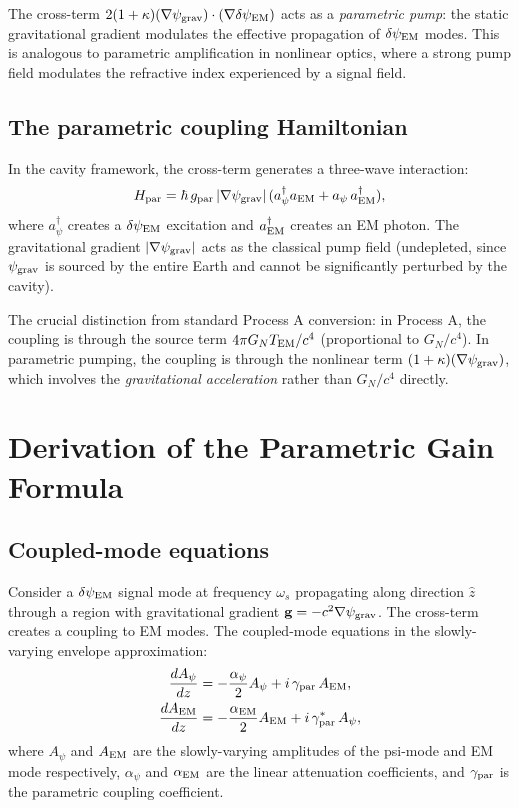\documentclass[11pt]{article}
\newcommand{\psigrav}{\psi_{\rm grav}}
\newcommand{\dpsiEM}{\delta\psi_{\rm EM}}
\newcommand{\GN}{G_N}
\begin{document}
The cross-term $2(1+\kappa)(\nabla\psigrav)\cdot(\nabla\dpsiEM)$ acts as
a \emph{parametric pump}: the static gravitational gradient modulates the
effective propagation of $\dpsiEM$ modes. This is analogous to parametric
amplification in nonlinear optics, where a strong pump field modulates the
refractive index experienced by a signal field.

\subsection{The parametric coupling Hamiltonian}

In the cavity framework, the cross-term generates a three-wave interaction:
\begin{equation}
H_{\rm par} = \hbar\,g_{\rm par}\,|\nabla\psigrav|\,
(a_\psi^\dagger a_{\rm EM} + a_\psi\,a_{\rm EM}^\dagger),
\label{eq:H-parametric}
\end{equation}
where $a_\psi^\dagger$ creates a $\dpsiEM$ excitation and $a_{\rm EM}^\dagger$
creates an EM photon. The gravitational gradient $|\nabla\psigrav|$ acts as
the classical pump field (undepleted, since $\psigrav$ is sourced by the
entire Earth and cannot be significantly perturbed by the cavity).

The crucial distinction from standard Process A conversion: in Process A,
the coupling is through the source term $4\pi\GN T_{\rm EM}/c^4$
(proportional to $\GN/c^4$). In parametric pumping, the coupling is through
the nonlinear term $(1+\kappa)(\nabla\psigrav)$, which involves the
\emph{gravitational acceleration} rather than $\GN/c^4$ directly.

\section{Derivation of the Parametric Gain Formula}
\label{sec:parametric-gain}

\subsection{Coupled-mode equations}

Consider a $\dpsiEM$ signal mode at frequency $\omega_s$ propagating along
direction $\hat{z}$ through a region with gravitational gradient
$\mathbf{g} = -c^2\nabla\psigrav$. The cross-term creates a coupling to
EM modes. The coupled-mode equations in the slowly-varying envelope
approximation:
\begin{align}
\frac{dA_\psi}{dz} &= -\frac{\alpha_\psi}{2}A_\psi
+ i\,\gamma_{\rm par}\,A_{\rm EM}, \label{eq:coupled-psi} \\
\frac{dA_{\rm EM}}{dz} &= -\frac{\alpha_{\rm EM}}{2}A_{\rm EM}
+ i\,\gamma_{\rm par}^*\,A_\psi, \label{eq:coupled-EM}
\end{align}
where $A_\psi$ and $A_{\rm EM}$ are the slowly-varying amplitudes of the
psi-mode and EM mode respectively, $\alpha_\psi$ and $\alpha_{\rm EM}$
are the linear attenuation coefficients, and $\gamma_{\rm par}$ is the
parametric coupling coefficient.
\end{document}
